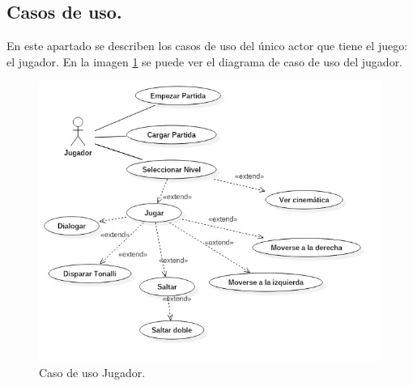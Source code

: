\subsection{Casos de uso.}
En este apartado se describen los casos de uso del único actor que tiene el juego: el jugador. En la imagen \ref{fig:casosUso} se puede ver el diagrama de caso de uso del jugador.

\begin{figure}
	\centering
	\includegraphics[width=\textwidth]{05TrabajoRealizado/01DocDiseno/imagenes/casoUso1.jpg}
	\caption{Caso de uso Jugador.}
	\label{fig:casosUso}
\end{figure}